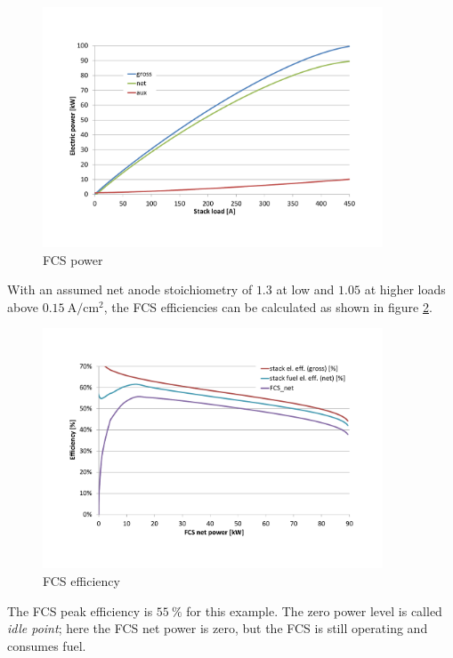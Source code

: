 \documentclass[11pt,a4paper,english,twoside]{scrreprt}
\begin{document}
\begin{figure}
  \centering
  \includegraphics*[width=0.9\textwidth,angle=0]{FCF_Chart_FCS_power.pdf}
  \caption[FCS power]{FCS power}
  \label{fig:FCS_power}
\end{figure}

With an assumed net anode stoichiometry of $\num{1.3}$ at low and $\num{1.05}$ at higher loads above $\SI{0.15}{\ampere\per\centi\meter\squared}$, the FCS efficiencies can be calculated as shown in figure \ref{fig:FCS_eff}.

\begin{figure}
  \centering
  \includegraphics*[width=0.9\textwidth,angle=0]{FCF_Chart_FCS_eff.pdf}
  \caption[FCS efficiency]{FCS efficiency}
  \label{fig:FCS_eff}
\end{figure}

The FCS peak efficiency is $\SI{55}{\percent}$ for this example. The zero power level is called \textit{idle point}; here the FCS net power is zero, but the FCS is still operating and consumes fuel.  
\end{document}
